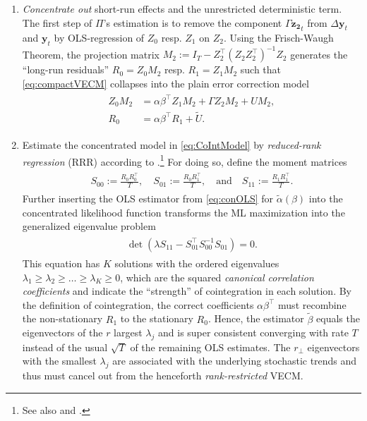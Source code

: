\begin{enumerate}[label=\textbf{\arabic*.}]
	\item \textit{Concentrate out} short-run effects and the unrestricted deterministic term. The first step of $ \Pi $'s estimation is to remove the component $ \Gamma \boldsymbol{z_2}_t $ from $ \Delta \boldsymbol{y}_t $ and $ \boldsymbol{y}_t $ by OLS-regression of $ Z_0 $ resp. $ Z_1 $ on $ Z_{2} $. Using the Frisch-Waugh Theorem, the projection matrix $ M_2 := I_T - Z_2^\top (Z^{\ }_2 Z_2^\top)^{-1} Z^{\ }_2 $ generates the ``long-run residuals'' $ R_{0} = Z_{0} M_2 $ resp. $ R_{1} = Z_{1} M_2 $ such that \eqref{eq:compactVECM} collapses into the plain error correction model
	\begin{align} \label{eq:CoIntModel}
	\begin{split}
		Z_{0} M_2 & = \alpha\beta^\top Z_{1} M_2 + \Gamma Z_{2} M_2 + U M_2, \\
		R_{0} & = \alpha\beta^\top R_{1} + \widetilde{U}.
	\end{split}
	\end{align} 
	\item Estimate the concentrated model in \eqref{eq:CoIntModel} by \textit{reduced-rank regression} (RRR) according to \citet{Anderson1951}.\footnote{See also \citet[Ch.~12.7]{Anderson2003} and \citet{Izenman1975}.} For doing so, define the moment matrices
	\begin{align} \label{eq:RRRmomat}
	\begin{split}
		S_{00} := \frac{R^{\ }_0 R_0^\top}{T}, \quad S_{01} := \frac{R^{\ }_0 R_1^\top}{T}, \quad \text{and} \quad S_{11} := \frac{R^{\ }_1 R_1^\top}{T}.
	\end{split}
	\end{align}
	Further inserting the OLS estimator from \eqref{eq:conOLS} for $ \widetilde{\alpha}(\beta) $ into the concentrated likelihood function transforms the ML maximization into the generalized eigenvalue problem
	\begin{align} \label{eq:RRReigen}
	\begin{split}
		\det \left( \lambda S_{11}^{\ } - S_{01}^\top S_{00}^{-1} S_{01}^{\ } \right) = 0.
	\end{split}
	\end{align} 
	This equation has $ K $ solutions with the ordered eigenvalues $ \lambda_1 \geq \lambda_2 \geq \ldots \geq \lambda_K \geq 0 $, which are the squared \textit{canonical correlation coefficients} and indicate the ``strength'' of cointegration in each solution. By the definition of cointegration, the correct coefficients $ \alpha\beta^\top $ must recombine the non-stationary $ R_{1} $ to the stationary $ R_{0} $. Hence, the estimator $ \widetilde{\beta} $ equals the eigenvectors of the $ r $ largest $ \lambda_j $ and is super consistent converging with rate $ T $ instead of the usual $ \sqrt{T} $ of the remaining OLS estimates. The $ r_\perp $ eigenvectors with the smallest $ \lambda_j $ are associated with the underlying stochastic trends and thus must cancel out from the henceforth \textit{rank-restricted} VECM.
	

\end{enumerate}
